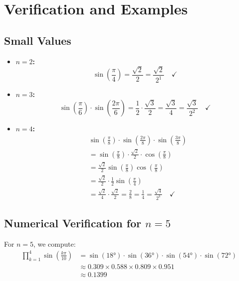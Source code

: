 \documentclass{article}
\begin{document}
\section{Verification and Examples}

\subsection{Small Values}

\begin{itemize}
\item \textbf{$n=2$:} 
\begin{equation}
\sin\left(\frac{\pi}{4}\right) = \frac{\sqrt{2}}{2} = \frac{\sqrt{2}}{2^1} \quad \checkmark
\end{equation}

\item \textbf{$n=3$:} 
\begin{equation}
\sin\left(\frac{\pi}{6}\right) \cdot \sin\left(\frac{2\pi}{6}\right) = \frac{1}{2} \cdot \frac{\sqrt{3}}{2} = \frac{\sqrt{3}}{4} = \frac{\sqrt{3}}{2^2} \quad \checkmark
\end{equation}

\item \textbf{$n=4$:} 
\begin{align}
&\sin\left(\frac{\pi}{8}\right) \cdot \sin\left(\frac{2\pi}{8}\right) \cdot \sin\left(\frac{3\pi}{8}\right) \\
&= \sin\left(\frac{\pi}{8}\right) \cdot \frac{\sqrt{2}}{2} \cdot \cos\left(\frac{\pi}{8}\right) \\
&= \frac{\sqrt{2}}{2} \sin\left(\frac{\pi}{8}\right)\cos\left(\frac{\pi}{8}\right) \\
&= \frac{\sqrt{2}}{2} \cdot \frac{1}{2}\sin\left(\frac{\pi}{4}\right) \\
&= \frac{\sqrt{2}}{4} \cdot \frac{\sqrt{2}}{2} = \frac{2}{8} = \frac{1}{4} = \frac{\sqrt{4}}{2^3} \quad \checkmark
\end{align}
\end{itemize}

\subsection{Numerical Verification for $n=5$}

For $n=5$, we compute:
\begin{align}
\prod_{k=1}^{4}\sin\left(\frac{k\pi}{10}\right) &= \sin(18°) \cdot \sin(36°) \cdot \sin(54°) \cdot \sin(72°) \\
&\approx 0.309 \times 0.588 \times 0.809 \times 0.951 \\
&\approx 0.1399
\end{align}
\end{document}
